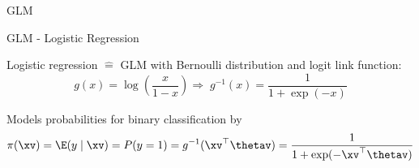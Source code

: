 \documentclass[10pt,compress,t,notes=noshow, xcolor=table]{beamer}
\begin{document}
\begin{framev}[align=top]{GLM }
\begin{itemizeM}
\end{itemizeM}
\end{framev}


\begin{framev}[align=top]{GLM - Logistic Regression}
\begin{itemizeM}
\item Logistic regression $\hat{=}$ GLM with Bernoulli distribution and logit link function:
$$
g(x) = \log\left(\frac{x}{1 - x}\right)
\Rightarrow \; g^{-1}(x) = \frac{1}{1 + \exp(-x)}
$$
\item Models probabilities for binary classification by
$$\pi(\xv) = \E(y \mid \xv) = P(y = 1) = g^{-1}(\xv^\top \thetav) = \frac{1}{1 + \exp(-\xv^\top \thetav)}$$
\end{itemizeM}
\centering
{}
\qquad
{}
\end{framev}
\end{document}
